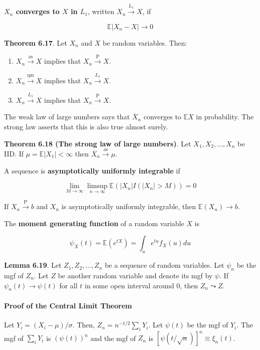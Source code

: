 \textbf{\(X_n\) converges to \(X\) in \(L_1\)}, written
\(X_n \xrightarrow{L_1} X\), if

\[ \mathbb{E} |X_n - X| \rightarrow 0 \]

\textbf{Theorem 6.17}. Let \(X_n\) and \(X\) be random variables. Then:

\begin{enumerate}[tightlist,label={\arabic*.}]
\item
  \(X_n \xrightarrow{\text{as}} X\) implies that
  \(X_n \xrightarrow{\text{P}} X\).
\item
  \(X_n \xrightarrow{\text{qm}} X\) implies that
  \(X_n \xrightarrow{L_1} X\).
\item
  \(X_n \xrightarrow{L_1} X\) implies that
  \(X_n \xrightarrow{\text{P}} X\).
\end{enumerate}

The weak law of large numbers says that \(\overline{X}_n\) converges to
\(\mathbb{E} X\) in probability. The strong law asserts that this is
also true almost surely.

\textbf{Theorem 6.18 (The strong law of large numbers)}. Let
\(X_1, X_2, \dots, X_n\) be IID. If \(\mu = \mathbb{E}|X_1| < \infty\)
then \(\overline{X}_n \xrightarrow{\text{as}} \mu\).

A sequence is \textbf{asymptotically uniformly integrable} if

\[ \lim _{M \rightarrow \infty} \limsup _{n \rightarrow \infty} \mathbb{E} ( |X_n| I(|X_n| > M) ) = 0 \]

If \(X_n \xrightarrow{\text{P}} b\) and \(X_n\) is asymptotically
uniformly integrable, then \(\mathbb{E}(X_n) \rightarrow b\).

The \textbf{moment generating function} of a random variable \(X\) is

\[\psi_X(t) = \mathbb{E}(e^{tX}) = \int_u e^{tu} f_X(u) du\]

\textbf{Lemma 6.19}. Let \(Z_1, Z_2, \dots, Z_n\) be a sequence of
random variables. Let \(\psi_n\) be the mgf of \(Z_n\). Let \(Z\) be
another random variable and denote its mgf by \(\psi\). If
\(\psi_n(t) \rightarrow \psi(t)\) for all \(t\) in some open interval
around 0, then \(Z_n \leadsto Z\).

\paragraph{Proof of the Central Limit
Theorem}\label{proof-of-the-central-limit-theorem}

Let \(Y_i = (X_i - \mu) / \sigma\). Then, \(Z_n = n^{-1/2} \sum_i Y_i\).
Let \(\psi(t)\) be the mgf of \(Y_i\). The mgf of \(\sum_i Y_i\) is
\((\psi(t))^n\) and the mgf of \(Z_n\) is
\([\psi(t / \sqrt{n})]^n \equiv \xi_n(t)\).

